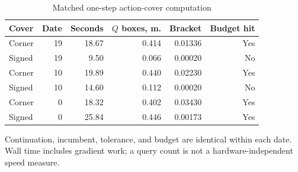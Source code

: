 \begin{table}[htbp]
\centering\small\setlength{\tabcolsep}{4pt}
\caption{Matched one-step action-cover computation}\label{tab:r9matched}
\begin{tabular}{lrrrrr}
\toprule
Cover & Date & Seconds & $Q$ boxes, m. & Bracket & Budget hit \\
\midrule
Corner & 19 & 18.67 & 0.414 & 0.01336 & Yes \\
Signed & 19 & 9.50 & 0.066 & 0.00020 & No \\
Corner & 10 & 19.89 & 0.440 & 0.02230 & Yes \\
Signed & 10 & 14.60 & 0.112 & 0.00020 & No \\
Corner & 0 & 18.32 & 0.402 & 0.03430 & Yes \\
Signed & 0 & 25.84 & 0.446 & 0.00173 & Yes \\
\bottomrule
\end{tabular}
\par\vspace{3pt}\begin{minipage}{0.97\linewidth}\footnotesize Continuation, incumbent, tolerance, and budget are identical within each date. Wall time includes gradient work; a query count is not a hardware-independent speed measure.\end{minipage}
\end{table}
